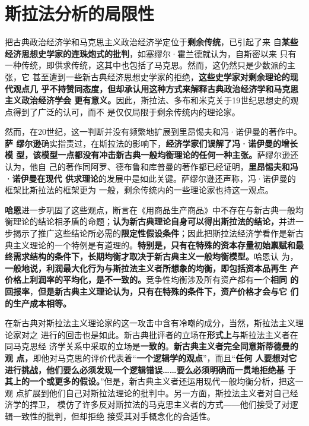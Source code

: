 \section{斯拉法分析的局限性}

把古典政治经济学和马克思主义政治经济学定位于\textbf{剩余传统}，已引起了来
自\textbf{某些经济思想史学家的连珠炮式的批判}，如塞缪尔·霍兰德就认为，自斯密以来
只有一种传统，即供求传统，这其中也包括了马克思。然而，这仍然只是少数派的主张，它
甚至遭到一些新古典经济思想史学家的拒绝，\textbf{这些史学家对剩余理论的现代观点几
  乎不持赞同态度，但却承认用这种方式来解释古典政治经济学和马克思主义政治经济学会
  更有意义。}因此，斯拉法、多布和米克关于19世纪思想史的观点得到了广泛的认可，而不
是仅仅局限于剩余传统内的理论家。

然而，在20世纪，这一判断并没有频繁地扩展到里昂惕夫和冯·诺伊曼的著作中。\textbf{萨
  缪尔逊}确实指责过，在斯拉法的影响下，\textbf{经济学家们误解了冯·诺伊曼的增长模
  型，该模型一点都没有冲击新古典一般均衡理论的任何一种主张。}萨缪尔逊还认为，他自
己的著作同阿罗、德布鲁和库普曼的著作都已经证明，\textbf{里昂惕夫和冯·诺伊曼在现代
  供求理论}的发展中是如此关键。萨缪尔逊还声称，冯·诺伊曼的框架比斯拉法的框架更为
一般，剩余传统内的一些理论家也持这一观点。

\textbf{哈恩}进一步巩固了这些观点，断言在《用商品生产商品》中不存在与新古典一般均
衡理论的结论相矛盾的命题；\textbf{认为新古典理论自身可以得出斯拉法的结论，}并进一
步揭示了推广这些结论所必需的\textbf{限定性假设条件}；因此把斯拉法经济学看作是新古
典主义理论的一个特例是有道理的。\textbf{特别是，只有在特殊的资本存量初始禀赋和最
  终需求结构的条件下，长期均衡才取决于新古典主义一般均衡模型。}哈恩认
为，\textbf{一般地说，利润最大化行为与斯拉法主义者所想象的均衡，即包括资本品再生
  产价格上利润率的平均化，是不一致的。}竞争性均衡涉及所有资产都有一个\textbf{相同
  的回报率}，\textbf{但是新古典主义理论认为，只有在特殊的条件下，资产价格才会与它
  们的生产成本相等。}

在新古典对斯拉法主义理论家的这一攻击中含有冷嘲的成分，当然，斯拉法主义理论家对之
进行的回击也是如此。新古典批评者的立场在\textbf{形式上}与斯拉法主义者在同马克思经
济学关系中采取的立场是\textbf{一致的}。\textbf{新古典主义者完全同意斯蒂德曼的观
  点，}即他对马克思的评价代表着“\textbf{一个逻辑学的观点}”，而且“\textbf{任何
  人要想对它进行挑战，他们要么必须发现一个逻辑错误……要么必须明确而一贯地拒绝基
  于其上的一个或更多的假设。}”但是，新古典主义者还运用现代一般均衡分析，把这一观
点扩展到他们自己对斯拉法理论的批判中。另一方面，斯拉法主义者对自己经济学的捍卫，
模仿了许多反对斯拉法的马克思主义者的方式——他们接受了对逻辑一致性的批判，但却拒绝
接受其对手概念化的合适性。

